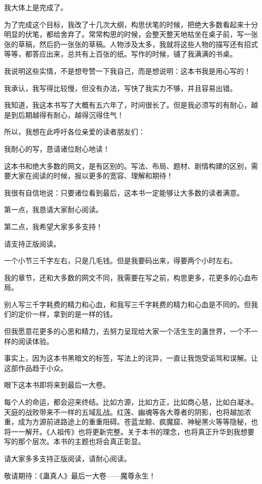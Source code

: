 \begin{this_body}
我大体上是完成了。

为了完成这个目标，我改了十几次大纲，构思伏笔的时候，把绝大多数看起来十分明显的伏笔，都给舍弃了。常常构思的时候，会整天整天地枯坐在桌子前，写一张张的草稿，然后扔一张张的草稿。人物涉及太多，我就将这些人物的描写还有招式等等，都答应出来，总共有上百张的纸。写作的时候，铺了我满满的书桌。

我说明这些实情，不是想夸赞一下我自己，而是想说明：这本书我是用心写的！

我承认，我写得比较慢，但没有办法，写快了我实力不够，并且容易出错。

我知道，我这本书写了大概有五六年了，时间很长了。但是我必须写的有耐心，越是到后期越得有耐心，越得沉得住气！

所以，我想在此呼吁各位亲爱的读者朋友们：

我耐心的写，恳请诸位耐心地读！

这本书和绝大多数的网文，是有区别的。写法、布局、题材、剧情构建的区别，需要大家在阅读的时候，报以更多的宽容、理解和期待！

我很有自信地说：只要诸位看到最后，这本书一定能够让大多数的读者满意。

第一点，我恳请大家耐心阅读。

第二点，我希望大家多多支持！

请支持正版阅读。

一个小节三千字左右，只是几毛钱。但是我要码出来，得要两个小时左右。

我的章节，还和大多数的网文不同，我需要在写之前，构思更多，花更多的心血布局。

别人写三千字耗费的精力和心血，和我写三千字耗费的精力和心血是不同的。但我们的定价一样，拿到的是一样的钱。

但我愿意花更多的心思和精力，去努力呈现给大家一个活生生的蛊世界，一个不一样的阅读体验。

事实上，因为这本书黑暗文的标签，写法上的诧异，一直让我饱受诟骂和误解。让这部作品趋于小众。

眼下这本书即将来到最后一大卷。

每个人的命运，都会迎来终结。比如方源，比如方正，比如商心慈，比如白凝冰。天庭的战败带来不一样的五域乱战。红莲、幽魂等各大尊者的阴影，也将越加浓重，成为方源前进路途上的重重阻碍。苍蓝龙鲸、疯魔窟、神秘黑火等等隐秘，也将一一解开。《人祖传》也将更新完整。关于本书的理念，也将真正升华到我想要写的那个层次。本书的主题也将会真正彰显。

请大家多多支持正版阅读，请耐心阅读。

敬请期待：《蛊真人》最后一大卷——魔尊永生！

\end{this_body}

